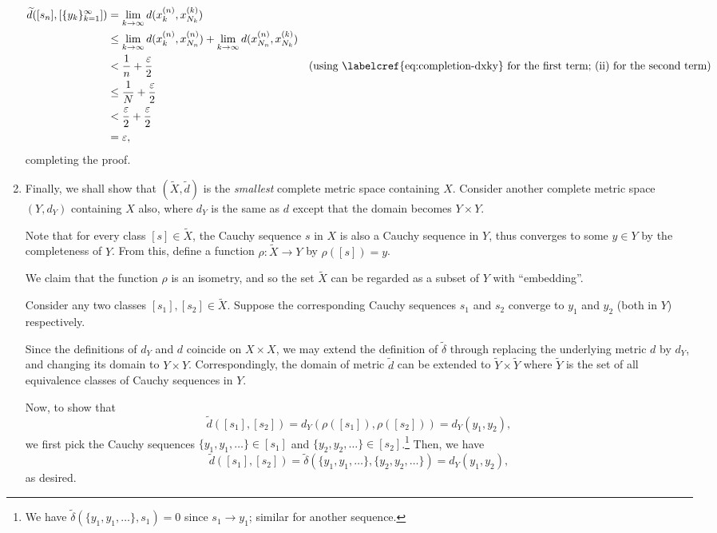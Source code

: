 \begin{enumerate}
\begin{pf}
\begin{align*}
\widetilde{d}([s_n],[\{y_k\}_{k=1}^{\infty}])
&=\lim_{k\to \infty}d(x_k^{(n)},x_{N_k}^{(k)})\\
&\le\lim_{k\to \infty}d(x_k^{(n)},x_{N_n}^{(n)})+\lim_{k\to \infty}d(x_{N_n}^{(n)},x_{N_k}^{(k)}) \\
&<\frac{1}{n}+\frac{\varepsilon}{2}&\text{(using \labelcref{eq:completion-dxky} for the first term; (ii) for the second term)} \\
&\le\frac{1}{N}+\frac{\varepsilon}{2} \\
&<\frac{\varepsilon}{2}+\frac{\varepsilon}{2} \\
&=\varepsilon,
\end{align*}
completing the proof.
\end{pf}
\item Finally, we shall show that \((\widetilde{X},\widetilde{d})\) is the
\emph{smallest} complete metric space containing \(X\). Consider another
complete metric space \((Y,d_Y)\) containing \(X\) also, where
\(d_Y\) is the same as \(d\) except that the domain
becomes \(Y\times Y\).

Note that for every class \([s]\in\widetilde{X}\), the Cauchy sequence \(s\) in
\(X\) is also a Cauchy sequence in \(Y\), thus converges to some \(y\in Y\) by
the completeness of \(Y\). From this, define a function \(\rho:\widetilde{X}\to
Y\) by \(\rho([s])=y\).

We claim that the function \(\rho\) is an isometry, and so the set
\(\widetilde{X}\) can be regarded as a subset of \(Y\) with ``embedding''.

\begin{pf}
Consider any two classes \([s_1],[s_2]\in\widetilde{X}\). Suppose the
corresponding Cauchy sequences \(s_1\) and \(s_2\) converge to \(y_1\) and
\(y_2\) (both in \(Y\)) respectively.

Since the definitions of \(d_Y\) and \(d\) coincide on \(X\times  X\), we may
extend the definition of \(\widetilde{\delta}\) through replacing the
underlying metric \(d\) by \(d_Y\), and changing its domain to \(Y\times Y\).
Correspondingly, the domain of metric \(\widetilde{d}\) can be extended to
\(\widetilde{Y}\times\widetilde{Y}\) where \(\widetilde{Y}\) is the set of all
equivalence classes of Cauchy sequences in \(Y\).

Now, to show that \[\widetilde{d}([s_1],[s_2])=d_Y(\rho([s_1]),\rho([s_2]))
=d_Y(y_1,y_2),\] we first pick the Cauchy sequences \(\{y_1,y_1,\dotsc\}\in
[s_1]\) and \(\{y_2,y_2,\dotsc\}\in [s_2]\).\footnote{We have
\(\widetilde{\delta}(\{y_1,y_1,\dotsc\},s_1)=0\) since \(s_1\to y_1\); similar
for another sequence.} Then, we have
\[
\widetilde{d}([s_1],[s_2])=\widetilde{\delta}(\{y_1,y_1,\dotsc\},\{y_2,y_2,\dotsc\})
=d_Y(y_1,y_2),
\]
as desired.
\end{pf}
\end{enumerate}
